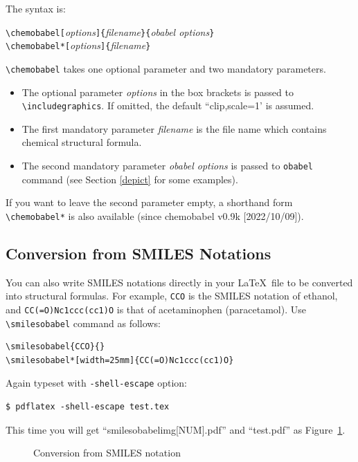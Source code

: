 \documentclass[12pt]{ltjsarticle}
\def\Lpack#1{\textsf{#1}}
\def\Lmeta#1{\textit{#1}}
\def\Lver#1{\Lpack{chemobabel} #1}
\begin{document}
The syntax is:
\begin{center}
\verb|\chemobabel[|\Lmeta{options}\verb|]{|\Lmeta{filename}\verb|}{|\Lmeta{obabel options}\verb|}| \\
\verb|\chemobabel*[|\Lmeta{options}\verb|]{|\Lmeta{filename}\verb|}|
\end{center}
\verb|\chemobabel| takes one optional parameter and two mandatory parameters.
\begin{itemize}
 \item The optional parameter \Lmeta{options} in the box brackets
   is passed to \verb|\includegraphics|.
   If omitted, the default ``clip,scale=1' is assumed.
 \item The first mandatory parameter \Lmeta{filename} is the file name
   which contains chemical structural formula.
 \item The second mandatory parameter \Lmeta{obabel options}
   is passed to \verb|obabel| command
   (see Section \ref{depict} for some examples).
\end{itemize}
If you want to leave the second parameter empty,
a shorthand form \verb|\chemobabel*| is also available
(since \Lver{v0.9k [2022/10/09]}).

\subsection{Conversion from SMILES Notations}

You can also write SMILES notations directly in your \LaTeX\ file to be
converted into structural formulas.
For example, \verb|CCO| is the SMILES notation of ethanol, and
\verb|CC(=O)Nc1ccc(cc1)O| is that of acetaminophen (paracetamol).
Use \verb|\smilesobabel| command as follows:

\begin{verbatim}
\smilesobabel{CCO}{}
\smilesobabel*[width=25mm]{CC(=O)Nc1ccc(cc1)O}
\end{verbatim}

Again typeset with \verb|-shell-escape| option:
\begin{verbatim}
$ pdflatex -shell-escape test.tex
\end{verbatim}
This time you will get ``smilesobabelimg[NUM].pdf'' and ``test.pdf''
as Figure~\ref{fig:smi1}.
\begin{figure}[h]
  \centering
   \quad
  \caption{Conversion from SMILES notation}\label{fig:smi1}
\end{figure}
\end{document}
